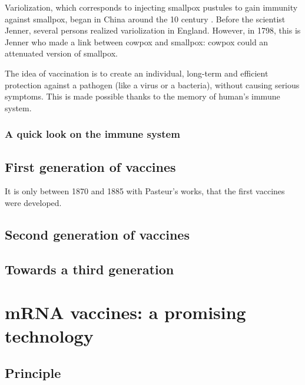 \documentclass{article}
\begin{document}
            Variolization, which corresponds to injecting smallpox pustules to gain immunity against smallpox, began in China around the 10 century \autocite{canouiHistoryPrinciplesVaccination2019}. 
            Before the scientist Jenner, several persons realized variolization in England. However, in 1798, this is Jenner who made a link between cowpox and smallpox: 
                cowpox could an attenuated version of smallpox.            

            The idea of vaccination is to create an individual, long-term and efficient protection against a pathogen (like a virus or a bacteria), without causing serious symptoms.
            This is made possible thanks to the memory of human's immune system.

            \subsubsection{A quick look on the immune system}





        \subsection{First generation of vaccines}
            
            It is only between 1870 and 1885 with Pasteur's works, that the first vaccines were developed.

        \subsection{Second generation of vaccines}

        \subsection{Towards a third generation}


    \section{mRNA vaccines: a promising technology}

        \subsection{Principle}
\end{document}
